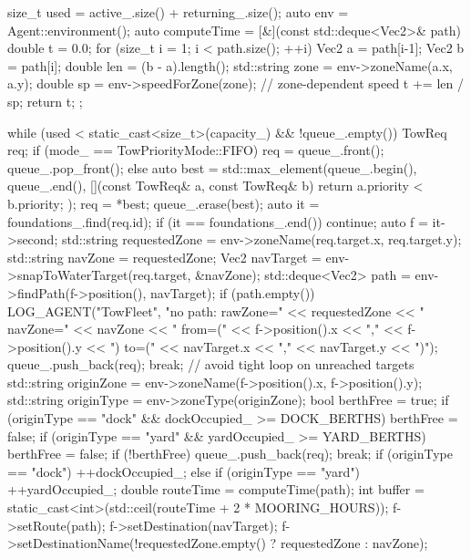 \documentclass[10pt,letterpaper]{jsarticle}
\begin{document}
\begin{cppcode}
{    size_t used = active_.size() + returning_.size();
    auto env = Agent::environment();
    auto computeTime = [&](const std::deque<Vec2>& path) {
        double t = 0.0;
        for (size_t i = 1; i < path.size(); ++i) {
            Vec2 a = path[i-1];
            Vec2 b = path[i];
            double len = (b - a).length();
            std::string zone = env->zoneName(a.x, a.y);
            double sp = env->speedForZone(zone); // zone-dependent speed
            t += len / sp;
        }
        return t;
    };

    while (used < static_cast<size_t>(capacity_) && !queue_.empty()) {
        TowReq req;
        if (mode_ == TowPriorityMode::FIFO) {
            req = queue_.front();
            queue_.pop_front();
        } else {
            auto best = std::max_element(queue_.begin(), queue_.end(),
                                         [](const TowReq& a, const TowReq& b){ return a.priority < b.priority; });
            req = *best;
            queue_.erase(best);
        }
        auto it = foundations_.find(req.id);
        if (it == foundations_.end()) continue;
        auto f = it->second;
        std::string requestedZone = env->zoneName(req.target.x, req.target.y);
        std::string navZone = requestedZone;
        Vec2 navTarget = env->snapToWaterTarget(req.target, &navZone);
        std::deque<Vec2> path = env->findPath(f->position(), navTarget);
        if (path.empty()) {
            LOG_AGENT("TowFleet", "no path: rawZone=" << requestedZone << " navZone=" << navZone
                      << " from=(" << f->position().x << "," << f->position().y
                      << ") to=(" << navTarget.x << "," << navTarget.y << ")");
            queue_.push_back(req);
            break; // avoid tight loop on unreached targets
        }
        std::string originZone = env->zoneName(f->position().x, f->position().y);
        std::string originType = env->zoneType(originZone);
        bool berthFree = true;
        if (originType == "dock" && dockOccupied_ >= DOCK_BERTHS) berthFree = false;
        if (originType == "yard" && yardOccupied_ >= YARD_BERTHS) berthFree = false;
        if (!berthFree) {
            queue_.push_back(req);
            break;
        }
        if (originType == "dock") ++dockOccupied_;
        else if (originType == "yard") ++yardOccupied_;
        double routeTime = computeTime(path);
        int buffer = static_cast<int>(std::ceil(routeTime + 2 * MOORING_HOURS));
        f->setRoute(path);
        f->setDestination(navTarget);
        f->setDestinationName(!requestedZone.empty() ? requestedZone : navZone);
}}
\end{cppcode}
\end{document}
